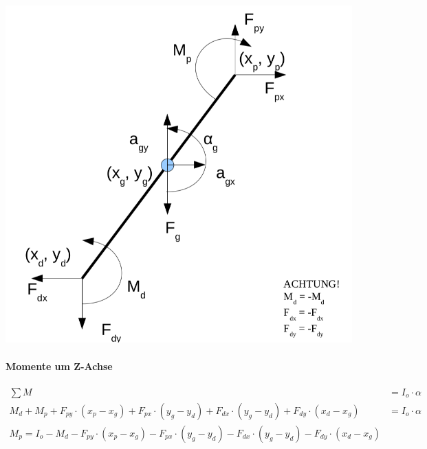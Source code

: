 \begin{minipage}{.5\linewidth}
	\includegraphics[width=\linewidth]{bilder/anhang/leg_segment}
	\label{fig:leg_segment}
\end{minipage}



\paragraph{Momente um Z-Achse}
\begin{equation*}
	\begin{split}
		\sum M &= I_o \cdot \alpha\\
		M_d + M_p + F_{py} \cdot (x_p - x_g) + F_{px} \cdot (y_g-y_d) + F_{dx} \cdot (y_g - y_d) + F_{dy} \cdot (x_d -x_g) &= I_o \cdot \alpha\\
		M_p = I_o - M_d - F_{py} \cdot (x_p - x_g) - F_{px} \cdot (y_g-y_d) - F_{dx} \cdot (y_g - y_d) - F_{dy} \cdot (x_d -x_g)
	\end{split}
\end{equation*}

